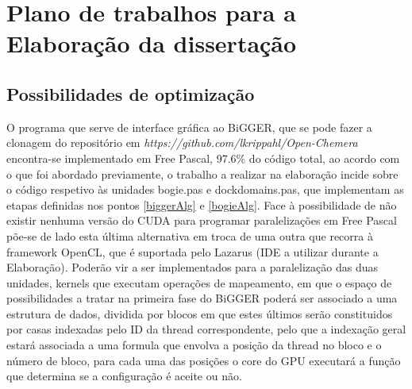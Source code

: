 \chapter{Plano de trabalhos para a Elaboração da dissertação}
\label{cha3}

%


\section{Possibilidades de optimização} %
\label{abordagem}
O programa que serve de interface gráfica ao BiGGER, que se pode fazer a clonagem do repositório em \textit{https://github.com/lkrippahl/Open-Chemera} encontra-se implementado em Free Pascal, 97.6\% do código total, ao acordo com o que foi abordado previamente, o trabalho a realizar na elaboração incide sobre o código respetivo às unidades bogie.pas e dockdomains.pas, que implementam as etapas definidas nos pontos \ref{biggerAlg} e \ref{bogieAlg}.
Face à possibilidade de não existir nenhuma versão do CUDA para programar paralelizações em Free Pascal%
 põe-se de lado esta última alternativa em troca de uma outra que recorra à framework OpenCL, que é suportada pelo Lazarus (IDE a utilizar durante a Elaboração).
Poderão vir a ser implementados para a paralelização das duas unidades, kernels que executam operações de mapeamento, em que o espaço de possibilidades a tratar na primeira fase do BiGGER poderá ser associado a uma estrutura de dados, dividida por blocos em que estes últimos serão constituidos por casas indexadas pelo ID da thread correspondente, pelo que a indexação geral estará associada a uma formula que envolva a posição da thread no bloco e o número de bloco, para cada uma das posições o core do GPU executará a função que determina se a configuração é aceite ou não.



